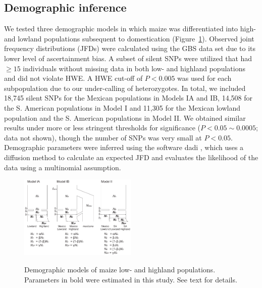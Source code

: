 \subsection*{Demographic inference}
We tested three demographic models in which maize was differentiated into high- and lowland populations subsequent to domestication (Figure~\ref{model}). 
Observed joint frequency distributions (JFDs) were calculated using the GBS data set due to its lower level of ascertainment bias. 
A subset of silent SNPs were utilized that had $\geq15$ individuals without missing data in both low- and highland populations and did not violate HWE.  
A HWE cut-off of $P<0.005$ was used for each subpopulation due to our under-calling of heterozygotes. 
In total, we included 18,745 silent SNPs for the Mexican populations in Models IA and IB, 14,508 for the S. American populations in Model I and 11,305 for the Mexican lowland population and the S. American populations in Model II.  
We obtained similar results under more or less stringent thresholds for significance ($P < 0.05\sim0.0005$; data not shown), though the number of SNPs was very small at $P<0.05$.  
Demographic parameters were inferred using the software {\sf dadi} \cite[]{Gutenkunst_2009_19851460}, which uses a diffusion method to calculate an expected JFD and evaluates the likelihood of the data using a multinomial assumption.

\begin{figure}[tb]   
  \begin{center}
   \vspace{-0mm}
   \includegraphics[width=0.5\textwidth]{fig/Fig3}
   \renewcommand{\baselinestretch}{0.9}
   \vspace{-3mm}
   \caption{ Demographic models of maize low- and highland populations.  Parameters in bold were estimated in this study.  See text for details.
   }
\vspace{-6mm}
    \label{model}
  \end{center}
\end{figure}

